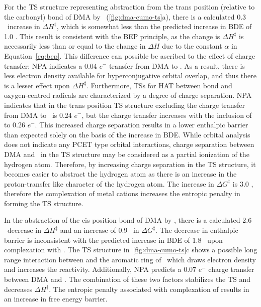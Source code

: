 For the TS structure representing abstraction from the trans position (relative
to the carbonyl)  bond of DMA by \cumo\ (\ref{fig:dma-cumo-ts}a), there
is a calculated 0.3 \kcalmol\ increase in $\Delta H^\ddagger$, which is somewhat
less than the predicted increase in BDE of 1.0 \kcalmol. This result is
consistent with the BEP principle, as the change is $\Delta H^\ddagger$ is
necessarily less than or equal to the change in $\Delta H$ due to the constant
$\alpha$ in Equation~\ref{eq:bep}. This difference can possible be ascribed to
the effect of charge transfer: NPA indicates a 0.04 $e^-$ transfer from DMA to
. As a result, there is less electron density available for
hyperconjugative orbital overlap, and thus there is a lesser effect upon $\Delta
H^\ddagger$.  Furthermore, TSs for HAT between  bond and oxygen-centred
radicals are characterized by a degree of charge separation.\cite{Roberts1999}
NPA indicates that in the trans position TS structure excluding  the
charge transfer from DMA to \cumo\ is 0.24 $e^-$, but the charge transfer
increases with the inclusion of  to 0.26 $e^-$. This increased charge
separation results in a lower enthalpic barrier than expected solely on the
basis of the increase in  BDE. While orbital analysis does not indicate
any PCET type orbital interactions, charge separation between DMA and \cumo\ in
the TS structure may be considered as a partial ionization of the hydrogen atom.
Therefore, by increasing charge separation in the TS structure, it becomes
easier to abstract the hydrogen atom as there is an increase in the
proton-transfer like character of the hydrogen atom. The increase in $\Delta
G^\ddagger$ is 3.0 \kcalmol, therefore the complexation of metal cations
increases the entropic penalty in forming the TS structure.

In the abstraction of the cis position  bond of DMA by \cumo, there is a
calculated 2.6 \kcalmol\ decrease in $\Delta H^\ddagger$ and an increase of 0.9
\kcalmol\ in $\Delta G^\ddagger$. The decrease in enthalpic barrier is
inconsistent with the predicted increase in BDE of 1.8 \kcalmol\ upon
complexation with . The TS structure in~\ref{fig:dma-cumo-ts}c shows a
possible long range interaction between  and the aromatic ring of \cumo\
which draws electron density and increases the reactivity. Additionally, NPA
predicts a 0.07 $e^-$ charge transfer between DMA and \ch{Na}. The combination
of these two factors stabilizes the TS and decreases $\Delta H^\ddagger$. The
entropic penalty associated with complexation of \ch{NaCl} results in an
increase in free energy barrier.

